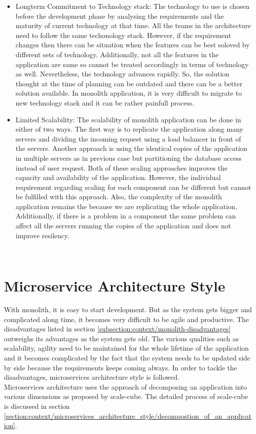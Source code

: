 \begin{itemize}[leftmargin=.5in]
\\
\item Longterm Commitment to Technology stack: The technology to use is chosen before the development phase by analysing the requirements and the maturity of current technology at that time. All the teams in the architecture need to follow the same techonology stack. However, if the requirement changes then there can be situation when the features can be best soloved by different sets of technology. Additionally, not all the features in the application are same so cannot be treated accordingly in terms of technology as well. Nevertheless, the technology advances rapidly. So, the solution thought at the time of planning can be outdated and there can be a better solution available. In monolith application, it is very difficult to migrate to new technology stack and it can be rather painfull process.
\\
\item Limited Scalability: The scalability of monolith application can be done in either of two ways. The first way is to replicate the application along many servers and dividing the incoming request using a load balancer in front of the servers. Another approach is using the identical copies of the application in multiple servers as in previous case but partitioning the database access instead of user request. Both of these scaling approaches improves the capacity and availability of the application. However, the individual requirement regarding scaling for each component can be different but cannot be fulfilled with this approach. Also, the complexity of the monolith application remains the because we are replicating the whole application. Additionally, if there is a problem in a component the same problem can affect all the servers running the copies of the application and does not improve resilency.\cite{MacVittie:2014aa}\cite{Namiot:2014aa}
\end{itemize}
\\

\section{Microservice Architecture Style}\label{section:context/microservices_architecture_style}
With monolith, it is easy to start development. But as the system gets bigger and complicated along time, it becomes very difficult to be agile and productive. The disadvantages listed in section \ref{subsection:context/monolith-disadvantages} outweighs its advantages as the system gets old. The various qualities such as scalability, agility need to be maintained for the whole lifetime of the application and it becomes complicated by the fact that the system needs to be updated side by side because the requirements keeps coming always. In order to tackle the disadvantages, microservices architecture style is followed.\\
Microservices architecture uses the approach of decomposing an application into various dimensions as proposed by scale-cube. The detailed process of scale-cube is discussed in section \ref{section:context/microservices_architecture_style/decompostion_of_an_application}.

